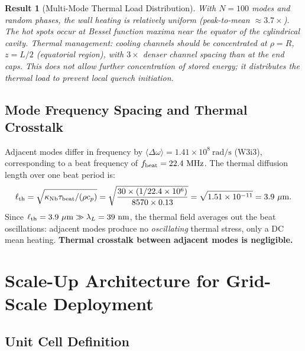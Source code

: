 \documentclass[aps,prd,twocolumn,superscriptaddress]{revtex4-2}
\newtheorem{result}{Result}
\begin{document}
\begin{result}[Multi-Mode Thermal Load Distribution]
With $N=100$ modes and random phases, the wall heating is relatively
uniform (peak-to-mean $\approx 3.7\times$).  The hot spots occur at
Bessel function maxima near the equator of the cylindrical cavity.
Thermal management: cooling channels should be concentrated at $\rho = R$,
$z = L/2$ (equatorial region), with $3\times$ denser channel spacing than
at the end caps.  This does \emph{not} allow further concentration of
stored energy; it distributes the thermal load to prevent local quench
initiation.
\end{result}

\subsection{Mode Frequency Spacing and Thermal Crosstalk}

Adjacent modes differ in frequency by $\langle\Delta\omega\rangle
= 1.41\times 10^8~\mathrm{rad/s}$ (W3i3), corresponding to a beat
frequency of $f_{\rm beat} = 22.4~\mathrm{MHz}$.  The thermal diffusion
length over one beat period is:
\begin{equation}
\ell_{\rm th} = \sqrt{\kappa_{\rm Nb}\tau_{\rm beat} / (\rho c_p)}
= \sqrt{\frac{30 \times (1/22.4\times 10^6)}{8570\times 0.13}}
= \sqrt{1.51\times 10^{-11}} = 3.9~\mu\mathrm{m}.
\end{equation}
Since $\ell_{\rm th} = 3.9~\mu\mathrm{m} \gg \lambda_L = 39~\mathrm{nm}$,
the thermal field averages out the beat oscillations: adjacent modes
produce no \emph{oscillating} thermal stress, only a DC mean heating.
\textbf{Thermal crosstalk between adjacent modes is negligible.}

\section{Scale-Up Architecture for Grid-Scale Deployment}
\label{sec:scaleup}

\subsection{Unit Cell Definition}
\end{document}
